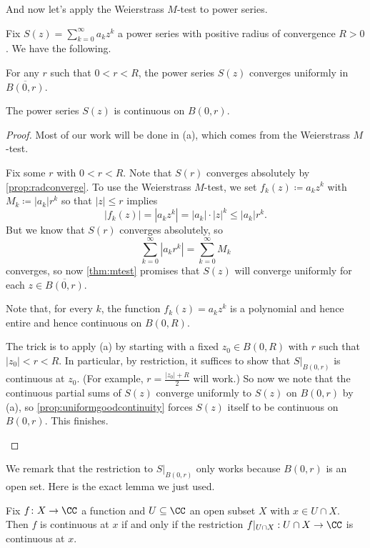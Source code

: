And now let's apply the Weierstrass $M$-test to power series.
\begin{corollary}
	Fix $S(z)=\sum_{k=0}^\infty a_kz^k$ a power series with positive radius of convergence $R>0$. We have the following.
	\begin{listalph}
		\item For any $r$ such that $0<r<R$, the power series $S(z)$ converges uniformly in $\overline{B(0,r)}$.
		\item The power series $S(z)$ is continuous on $B(0,r)$.
	\end{listalph}
\end{corollary}
\begin{proof}
	Most of our work will be done in (a), which comes from the Weierstrass $M$-test.
	\begin{listalph}
		\item Fix some $r$ with $0<r<R$. Note that $S(r)$ converges absolutely by \autoref{prop:radconverge}. To use the Weierstrass $M$-test, we set $f_k(z)\coloneqq a_kz^k$ with $M_k\coloneqq |a_k|r^k$ so that $|z|\le r$ implies
		\[|f_k(z)|=\left|a_kz^k\right|=|a_k|\cdot|z|^k\le|a_k|r^k.\]
		But we know that $S(r)$ converges absolutely, so
		\[\sum_{k=0}^\infty\left|a_kr^k\right|=\sum_{k=0}^\infty M_k\]
		converges, so now \autoref{thm:mtest} promises that $S(z)$ will converge uniformly for each $z\in\overline{B(0,r)}$.

		\item Note that, for every $k$, the function $f_k(z)=a_kz^k$ is a polynomial and hence entire and hence continuous on $B(0,R)$.

		The trick is to apply (a) by starting with a fixed $z_0\in B(0,R)$ with $r$ such that $|z_0|<r<R$. In particular, by restriction, it suffices to show that $S|_{B(0,r)}$ is continuous at $z_0$. (For example, $r=\frac{|z_0|+R}2$ will work.) So now we note that the continuous partial sums of $S(z)$ converge uniformly to $S(z)$ on $B(0,r)$ by (a), so \autoref{prop:uniformgoodcontinuity} forces $S(z)$ itself to be continuous on $B(0,r)$. This finishes.
		\qedhere
	\end{listalph}
\end{proof}
We remark that the restriction to $S|_{B(0,r)}$ only works because $B(0,r)$ is an open set. Here is the exact lemma we just used.
\begin{lemma} \label{lem:restrictcont}
	Fix $f\colon X\to\CC$ a function and $U\subseteq\CC$ an open subset $X$ with $x\in U\cap X$. Then $f$ is continuous at $x$ if and only if the restriction $f|_{U\cap X}:U\cap X\to\CC$ is continuous at $x$.
\end{lemma}
